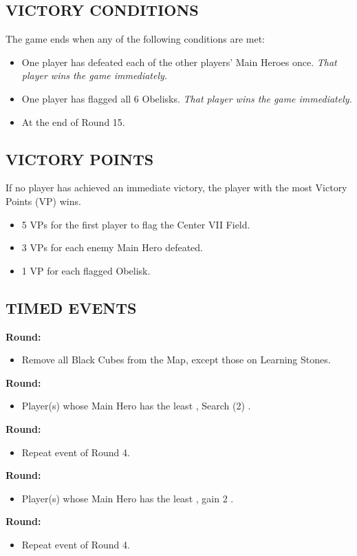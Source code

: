 \begin{multicols*}{2}
\subsection*{\MakeUppercase{Victory Conditions}}
The game ends when any of the following conditions are met:

\begin{itemize}
  \item One player has defeated each of the other players' Main Heroes once. \textit{That player wins the game immediately.}
  \item One player has flagged all 6 Obelisks. \textit{That player wins the game immediately.}
  \item At the end of Round 15.
\end{itemize}

\subsection*{\MakeUppercase{Victory Points}}
If no player has achieved an immediate victory, the player with the most Victory Points (VP) wins.

\begin{itemize}
  \item 5 VPs for the first player to flag the Center VII Field.
  \item 3 VPs for each enemy Main Hero defeated.
  \item 1 VP for each flagged Obelisk.
\end{itemize}

\subsection*{\MakeUppercase{Timed Events}}
\textbf{ Round:}
\begin{itemize}
  \item Remove all Black Cubes from the Map, except those on Learning Stones.
\end{itemize}
\textbf{ Round:}
\begin{itemize}
  \item Player(s) whose Main Hero has the least , Search (2) .
\end{itemize}
\textbf{ Round:}
\begin{itemize}
  \item Repeat event of Round 4.
\end{itemize}
\textbf{ Round:}
\begin{itemize}
  \item Player(s) whose Main Hero has the least , gain 2 .
\end{itemize}
\textbf{ Round:}
\begin{itemize}
  \item Repeat event of Round 4.
\end{itemize}


\end{multicols*}
